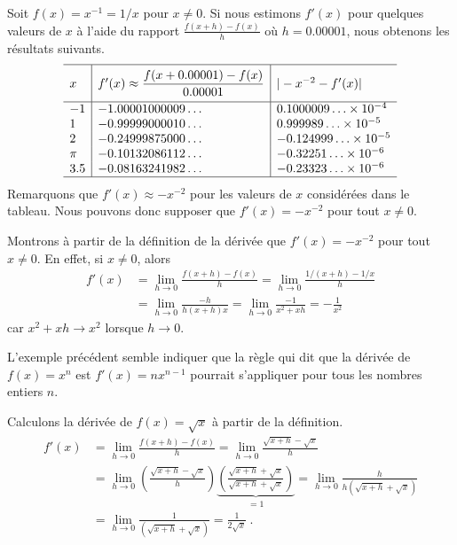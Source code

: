 {\begin{egg}
Soit $f(x)= x^{-1} = 1/x$ pour $x\neq 0$.  Si nous estimons $f'(x)$ pour
quelques valeurs de $x$ à l'aide du rapport
$\displaystyle \frac{f(x+h)-f(x)}{h}$ où
$h = 0.00001$, nous obtenons les résultats suivants.
\[
\begin{array}{l|l|l}
\hline
\rule[-0.7em]{0ex}{2.5em} x &
f'(x) \approx \displaystyle \frac{f(x+0.00001)-f(x)}{0.00001}
 & |-x^{-2} - f'(x) | \\[0.8em]
\hline
-1 & -1.00001000009\ldots & 0.1000009\ldots \times 10^{-4} \\
 1 & -0.99999000010\ldots & 0.999989\ldots \times 10^{-5} \\
 2 & -0.24999875000\ldots & -0.124999\ldots \times 10^{-5} \\
\pi & -0.10132086112\ldots & -0.32251\ldots \times 10^{-6} \\
3.5 & -0.08163241982\ldots & -0.23323\ldots \times 10^{-6} \\
\hline
\end{array}
\]
Remarquons que $f'(x) \approx -x^{-2}$ pour les valeurs de $x$
considérées dans le tableau.  Nous pouvons donc supposer que
$f'(x) = -x^{-2}$ pour tout $x\neq 0$.

Montrons à partir de la définition de la dérivée que
$f'(x) = -x^{-2}$ pour tout $x\neq 0$.  En effet, si $x\neq 0$, alors
\begin{align*}
f'(x) &= \lim_{h\to 0} \frac{f(x+h)-f(x)}{h}
= \lim_{h\to 0} \frac{1/(x+h) - 1/x}{h} \\
&= \lim_{h\to 0} \frac{-h}{h(x+h)x}
= \lim_{h\to 0} \frac{-1}{x^2 + x h} = -\frac{1}{x^2}
\end{align*}
car $x^2 + x h \to x^2$ lorsque $h \to 0$.
\label{XminusONE}
\end{egg}

L'exemple précédent semble indiquer que la règle qui dit que la
dérivée de $f(x) = x^n$ est $f'(x) = nx^{n-1}$ pourrait s'appliquer
pour tous les nombres entiers $n$.

\begin{egg}
Calculons la dérivée de $f(x) = \sqrt{x}$ à partir de la définition.
\begin{align*}
f'(x) &= \lim_{h\to 0} \frac{f(x+h)-f(x)}{h}
= \lim_{h\to 0} \frac{\sqrt{x+h}-\sqrt{x}}{h} \\
&= \lim_{h\to 0} \left(\frac{\sqrt{x+h}-\sqrt{x}}{h}\right)
\underbrace{\left(\frac{\sqrt{x+h}+\sqrt{x}}{\sqrt{x+h}+\sqrt{x}}\right)}_{=1}
= \lim_{h\to 0} \frac{h}{h(\sqrt{x+h}+\sqrt{x})} \\
&= \lim_{h\to 0} \frac{1}{(\sqrt{x+h}+\sqrt{x})} = \frac{1}{2\sqrt{x}} \ .
\end{align*}
\end{egg}

}
